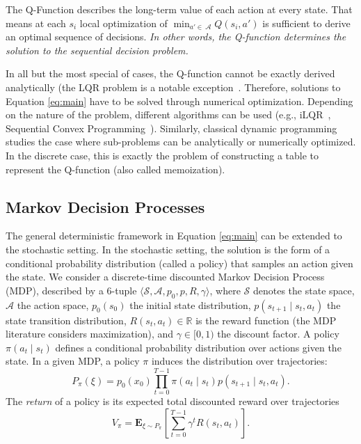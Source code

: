 The Q-Function describes the long-term value of each action at every state. 
That means at each $s_i$ local optimization of $\min_{a' \in ~ \mathcal{A} } Q(s_i,a')$ is sufficient to derive an optimal sequence of decisions. \emph{In other words, the Q-function determines the solution to the sequential decision problem.} 

In all but the most special of cases, the Q-function cannot be exactly derived analytically (the LQR problem is a notable exception~\cite{kalman1960contributions}. Therefore, solutions to Equation \ref{eq:main} have to be solved through numerical optimization.
Depending on the nature of the problem, different algorithms can be used (e.g., iLQR~\cite{li2004iterative}, Sequential Convex Programming~\cite{augugliaro2012generation}). Similarly, classical dynamic programming studies the case where sub-problems can be analytically or numerically optimized. In the discrete case, this is exactly the problem of constructing a table to represent the Q-function (also called memoization).

\subsection*{Markov Decision Processes}
The general deterministic framework in Equation \ref{eq:main} can be extended to the stochastic setting.
In the stochastic setting, the solution is the form of a conditional probability distribution (called a policy) that samples an action given the state.
We consider a discrete-time discounted Markov Decision Process (MDP), described by a 6-tuple $\langle \mathcal{S}, \mathcal{A}, p_0, p, R, \gamma \rangle$, where $\mathcal{S}$ denotes the state space, $\mathcal{A}$ the action space, $p_0(s_0)$ the initial state distribution, $p(s_{t+1} \mid s_{t}, a_{t})$ the state transition distribution, $R(s_t, a_t) \in \mathbb{R}$ is the reward function (the MDP literature considers maximization), and $\gamma \in [0,1)$ the discount factor. A policy $\pi(a_t \mid s_t)$ defines a conditional probability distribution over actions given the state.  In a given MDP, a policy $\pi$ induces the distribution over trajectories:
\[
P_\pi(\xi) = p_0(x_0) \prod_{t=0}^{T-1} \pi(a_t \mid s_t) p(s_{t+1} \mid s_{t}, a_{t}).
\]
The \emph{return} of a policy is its expected total discounted reward over trajectories
\[
V_\pi = \mathbf{E}_{\xi \sim P_\pi}\left[\sum_{t=0}^{T-1} \gamma^t R(s_t,a_t)\right].
\]



